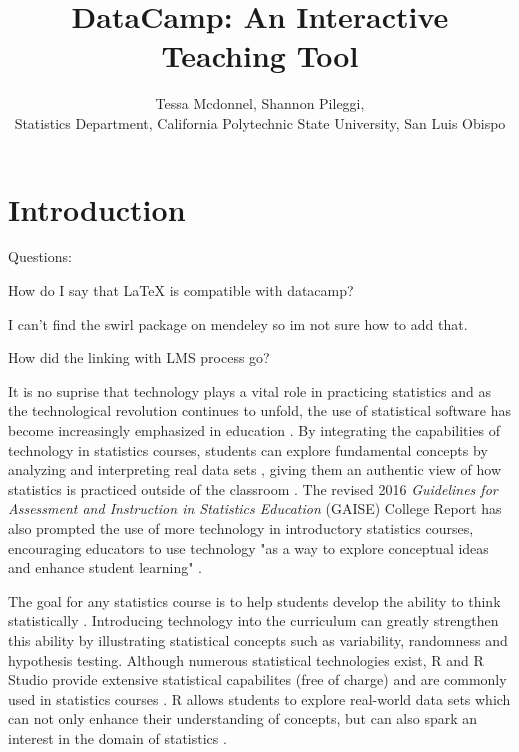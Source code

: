\documentclass[12pt]{article}
\title{DataCamp: An Interactive Teaching Tool}
\author{Tessa Mcdonnel, Shannon Pileggi,  \\Statistics Department, California Polytechnic State University, San Luis Obispo}
\begin{document}
\maketitle

\section{Introduction}

\doublespacing

Questions: 

How do I say that LaTeX is compatible with datacamp?

I can't find the swirl package on mendeley so im not sure how to add that.

How did the linking with LMS process go?


It is no suprise that technology plays a vital role in practicing statistics and as the technological revolution continues to
unfold, the use of statistical software has become increasingly emphasized in education \citep{AmericanStatisticalAssociation2016}. By integrating the
capabilities of technology in statistics courses, students can explore fundamental concepts by analyzing and
interpreting real data sets \citep{Chance2007, Hardin2015, Horton2014}, giving them an authentic view of how statistics is practiced outside of the
classroom \citep{Wang2017}. The revised 2016 \textit{Guidelines for Assessment and Instruction in Statistics Education}
(GAISE) College Report has also prompted the use of more technology in introductory statistics courses, encouraging educators
to use technology "as a way to explore conceptual ideas and enhance student learning" \citep{AmericanStatisticalAssociation2016}.

The goal for any statistics course is to help students develop the ability to think statistically
\citep{AmericanStatisticalAssociation2016}.
Introducing technology into the curriculum can greatly strengthen this ability by illustrating statistical concepts such as
variability, randomness and hypothesis testing. Although numerous statistical technologies exist, R and R Studio
provide extensive statistical capabilites (free of charge) and are commonly used in statistics courses \citep{Chance2007}. R
allows students to explore real-world data sets which can not only enhance their understanding of concepts, but can also spark
an interest in the domain of statistics \citep{Wang2017}.
\end{document}
